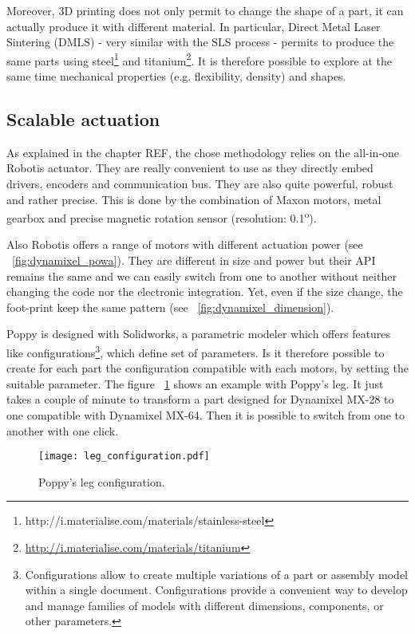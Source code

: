 Moreover, 3D printing does not only permit to change the shape of a part, it can actually produce it with different material. In particular, Direct Metal Laser Sintering (DMLS) - very similar with the SLS process - permits to produce the same parts using steel\footnote{http://i.materialise.com/materials/stainless-steel} and titanium\footnote{\url{http://i.materialise.com/materials/titanium}}. It is therefore possible to explore at the same time mechanical properties (e.g. flexibility, density) and shapes.


\subsection{Scalable actuation} %

As explained in the chapter REF, the chose methodology relies on the all-in-one Robotis actuator. They are really convenient to use as they directly embed drivers, encoders and communication bus. They are also quite powerful, robust and rather precise. This is done by the combination of Maxon motors, metal gearbox and precise magnetic rotation sensor (resolution: 0.1\textsuperscript{o}).

Also Robotis offers a range of motors with different actuation power (see \figurename~\ref{fig:dynamixel_powa}). They are different in size and power but their API remains the same and we can easily switch from one to another without neither changing the code nor the electronic integration. Yet, even if the size change, the foot-print keep the same pattern (see \figurename~\ref{fig:dynamixel_dimension}).

Poppy is designed with Solidworks, a parametric modeler which offers features like configurations\footnote{Configurations allow to create multiple variations of a part or assembly model within a single document. Configurations provide a convenient way to develop and manage families of models with different dimensions, components, or other parameters.}, which define set of parameters. Is it therefore possible to create for each part the configuration compatible with each motors, by setting the suitable parameter. The figure \figurename~\ref{fig:leg_configuration} shows an example with Poppy's leg. It just takes a couple of minute to transform a part designed for Dynamixel MX-28 to one compatible with Dynamixel MX-64. Then it is possible to switch from one to another with one click.

\begin{figure}[h]
    \begin{center}
        \texttt{[image: leg\_configuration.pdf]}
    \end{center}
    \caption{Poppy's leg configuration.}
    \label{fig:leg_configuration}
\end{figure}

